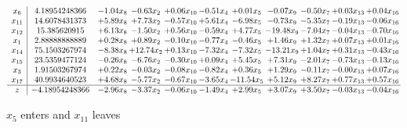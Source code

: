 \documentclass[9pt]{article}
\begin{document}
 \[\begin{array}{c| c c@{\hskip 2pt} c@{\hskip 2pt} c@{\hskip 2pt} c@{\hskip 2pt} c@{\hskip 2pt} c@{\hskip 2pt} c@{\hskip 2pt} c@{\hskip 2pt} c@{\hskip 2pt} }
 x_{6}   &  4.18954248366 & -1.04 x_{8} & -0.63 x_{2} & +  0.06 x_{10} & -0.51 x_{4} & +  0.01 x_{5} & -0.07 x_{9} & -0.50 x_{7} & +  0.03 x_{13} & +  0.04 x_{16}\\
 x_{11}   &  14.6078431373 & +  5.89 x_{8} & +  7.73 x_{2} & -0.57 x_{10} & +  5.61 x_{4} & -6.98 x_{5} & -0.73 x_{9} & -5.35 x_{7} & -0.19 x_{13} & -0.06 x_{16}\\
 x_{12}   &  15.385620915 & +  6.13 x_{8} & -1.50 x_{2} & +  0.56 x_{10} & -0.59 x_{4} & +  4.77 x_{5} & -19.48 x_{9} & -7.04 x_{7} & -0.04 x_{13} & -0.70 x_{16}\\
 x_{1}   &  2.88888888889 & +  0.28 x_{8} & +  0.89 x_{2} & -0.10 x_{10} & -0.77 x_{4} & -0.46 x_{5} & +  1.46 x_{9} & +  1.32 x_{7} & +  0.07 x_{13} & +  0.01 x_{16}\\
 x_{14}   &  75.1503267974 & -8.38 x_{8} & + 12.74 x_{2} & +  0.13 x_{10} & -7.32 x_{4} & -7.32 x_{5} & -13.21 x_{9} & +  1.04 x_{7} & +  0.31 x_{13} & -0.43 x_{16}\\
 x_{15}   &  23.5359477124 & -0.26 x_{8} & -6.76 x_{2} & -0.30 x_{10} & +  0.09 x_{4} & +  5.45 x_{5} & +  7.31 x_{9} & -2.01 x_{7} & -0.73 x_{13} & -0.13 x_{16}\\
 x_{3}   &  1.91503267974 & +  0.22 x_{8} & -0.03 x_{2} & -0.08 x_{10} & -0.82 x_{4} & +  0.36 x_{5} & +  1.29 x_{9} & -0.11 x_{7} & -0.00 x_{13} & +  0.07 x_{16}\\
 x_{17}   &  40.9934640523 & +  4.68 x_{8} & -5.77 x_{2} & -0.67 x_{10} & -3.65 x_{4} & -11.54 x_{5} & +  5.12 x_{9} & +  8.27 x_{7} & +  0.77 x_{13} & +  0.57 x_{16}\\
\hline
z    &  -4.18954248366 & -2.96 x_{8} & -3.37 x_{2} & -0.06 x_{10} & -1.49 x_{4} & +  2.99 x_{5} & +  3.07 x_{9} & +  3.50 x_{7} & -0.03 x_{13} & -0.04 x_{16}\\
\end{array}\]


 $ x_{5} $ enters and $ x_{11} $ leaves 
\end{document}
